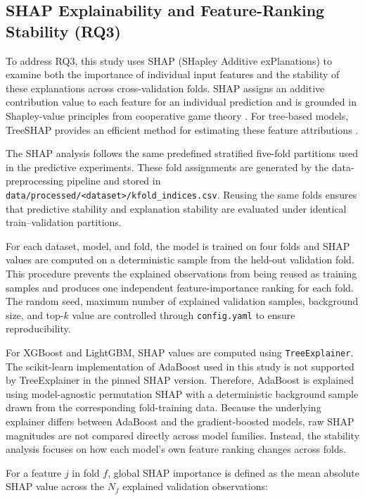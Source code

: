\subsection{SHAP Explainability and Feature-Ranking Stability (RQ3)}
\label{subsec:shap_methodology}

To address RQ3, this study uses SHAP (SHapley Additive exPlanations) to examine
both the importance of individual input features and the stability of these
explanations across cross-validation folds. SHAP assigns an additive
contribution value to each feature for an individual prediction and is grounded
in Shapley-value principles from cooperative game theory
\cite{lundberg2017shap}. For tree-based models, TreeSHAP provides an efficient
method for estimating these feature attributions
\cite{lundberg2020treeexplainer}.

The SHAP analysis follows the same predefined stratified five-fold partitions
used in the predictive experiments. These fold assignments are generated by the
data-preprocessing pipeline and stored in
\texttt{data/processed/<dataset>/kfold\_indices.csv}. Reusing the same folds
ensures that predictive stability and explanation stability are evaluated under
identical train--validation partitions.

For each dataset, model, and fold, the model is trained on four folds and SHAP
values are computed on a deterministic sample from the held-out validation fold.
This procedure prevents the explained observations from being reused as
training samples and produces one independent feature-importance ranking for
each fold. The random seed, maximum number of explained validation samples,
background size, and top-$k$ value are controlled through
\texttt{config.yaml} to ensure reproducibility.

For XGBoost and LightGBM, SHAP values are computed using
\texttt{TreeExplainer}. The scikit-learn implementation of AdaBoost used in this
study is not supported by TreeExplainer in the pinned SHAP version. Therefore,
AdaBoost is explained using model-agnostic permutation SHAP with a deterministic
background sample drawn from the corresponding fold-training data. Because the
underlying explainer differs between AdaBoost and the gradient-boosted models,
raw SHAP magnitudes are not compared directly across model families. Instead,
the stability analysis focuses on how each model's own feature ranking changes
across folds.

For a feature $j$ in fold $f$, global SHAP importance is defined as the mean
absolute SHAP value across the $N_f$ explained validation observations:

